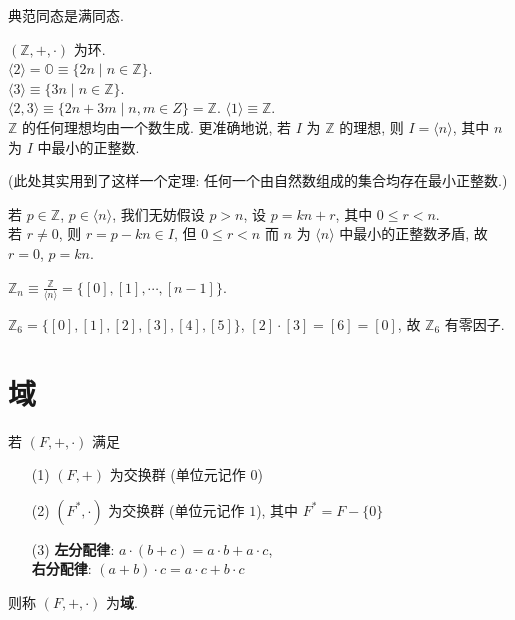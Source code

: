 \documentclass{note}
\begin{document}
典范同态是满同态.

\begin{eg}
    $(\mathbb{Z},+,\cdot)$ 为环.\\
    $\langle 2\rangle=\mathbb{O}\equiv\{2n\mid n\in\mathbb{Z}\}$.\\
    $\langle 3\rangle\equiv\{3n\mid n\in\mathbb{Z}\}$.\\
    $\langle 2,3\rangle\equiv\{2n+3m\mid n,m\in Z\}=\mathbb{Z}$.
    $\langle 1\rangle\equiv\mathbb{Z}$.\\
    $\mathbb{Z}$ 的任何理想均由一个数生成. 更准确地说, 若 $I$ 为 $\mathbb{Z}$ 的理想, 则 $I=\langle n\rangle$, 其中 $n$ 为 $I$ 中最小的正整数.
\end{eg}
(此处其实用到了这样一个定理: 任何一个由自然数组成的集合均存在最小正整数.)
\begin{pf}
    若 $p\in\mathbb{Z}$, $p\in\langle n\rangle$, 我们无妨假设 $p>n$, 设 $p=kn+r$, 其中 $0\leq r<n$.\\
    若 $r\neq 0$, 则 $r=p-kn\in I$, 但 $0\leq r<n$ 而 $n$ 为 $\langle n\rangle$ 中最小的正整数矛盾, 故 $r=0$, $p=kn$.
\end{pf}

\begin{df}[剩余类环]
    $\mathbb{Z}_n\equiv\frac{\mathbb{Z}}{\langle n\rangle}=\{[0],[1],\cdots,[n-1]\}$.
\end{df}

\begin{eg}
    $\mathbb{Z}_6=\{[0],[1],[2],[3],[4],[5]\}$, $[2]\cdot[3]=[6]=[0]$, 故 $\mathbb{Z}_6$ 有零因子.
\end{eg}

\section{域}
\begin{df}[域]
    若 $(F,+,\cdot)$ 满足
    \begin{itemize}
        \item[(1)] $(F,+)$ 为交换群 (单位元记作 $0$)
        \item[(2)] $(F^*,\cdot)$ 为交换群 (单位元记作 $1$), 其中 $F^*=F-\{0\}$
        \item[(3)] \textbf{左分配律}: $a\cdot(b+c)=a\cdot b+a\cdot c$,\\
        \textbf{右分配律}: $(a+b)\cdot c=a\cdot c+b\cdot c$
    \end{itemize}
    则称 $(F,+,\cdot)$ 为\textbf{域}.
\end{df}
\end{document}
